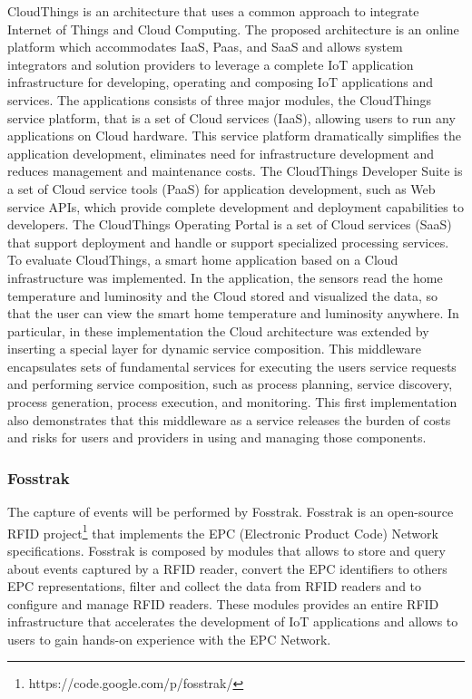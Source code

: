 CloudThings \cite{zhou2013cloudthings} is an architecture that uses a common approach
to integrate Internet of Things and Cloud Computing. The proposed architecture is an online
platform which accommodates IaaS, Paas, and SaaS and allows system integrators and solution
providers to leverage a complete IoT application infrastructure for developing, operating and
composing IoT applications and services. The applications consists of three major modules,
the CloudThings service platform, that is a set of Cloud services (IaaS), allowing users to
run any applications on Cloud hardware. This service platform dramatically simplifies the
application development, eliminates need for infrastructure development and reduces management
and maintenance costs. The CloudThings Developer Suite is a set of Cloud service tools (PaaS) for
application development, such as Web service APIs, which provide complete development and
deployment capabilities to developers. The CloudThings Operating Portal is a set of Cloud
services (SaaS) that support deployment and handle or support specialized processing services.
To evaluate CloudThings, a smart home application based on a Cloud infrastructure was implemented.
In the application, the sensors read the home temperature and luminosity and the Cloud
stored and visualized the data, so that the user can view the smart home temperature and luminosity
anywhere. In particular, in these implementation the Cloud architecture was extended by inserting
a special layer for dynamic service composition. This middleware encapsulates sets of fundamental
services for executing the users service requests and performing service composition, such as process planning,
service discovery, process generation, process execution, and monitoring. This first implementation
also demonstrates that this middleware as a service releases the burden of costs and risks for users and
providers in using and managing those components.\\

\subsubsection{Fosstrak}
\label{subs:fosstrak}
The capture of events will be performed by Fosstrak. Fosstrak is an open-source RFID
project\footnote{https://code.google.com/p/fosstrak/} that implements the EPC (Electronic Product Code)
Network specifications. Fosstrak is composed by modules that allows to store and query about
events captured by a RFID reader, convert the EPC identifiers to others EPC representations,
filter and collect the data from RFID readers and to configure and manage RFID readers.
These modules provides an entire RFID infrastructure that accelerates the development of
IoT applications and allows to users to gain hands-on experience with the EPC Network.\\

